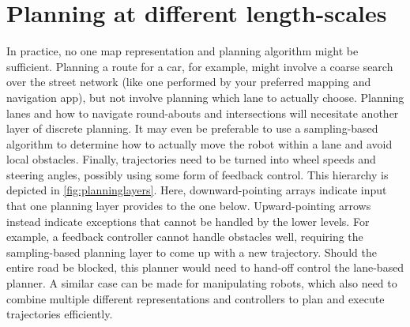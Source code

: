 \section{Planning at different length-scales}
In practice, no one map representation and planning algorithm might be sufficient. Planning a route for a car, for example, might involve a coarse search over the street network (like one performed by your preferred mapping and navigation app), but not involve planning which lane to actually choose. Planning lanes and how to navigate round-abouts and intersections will necesitate another layer of discrete planning. It may even be preferable to use a sampling-based algorithm to determine how to actually move the robot within a lane and avoid local obstacles. Finally, trajectories need to be turned into wheel speeds and steering angles, possibly using some form of feedback control. This hierarchy is depicted in \cref{fig:planninglayers}. Here, downward-pointing arrays indicate input that one planning layer provides to the one below. Upward-pointing arrows instead indicate exceptions that cannot be handled by the lower levels. For example, a feedback controller cannot handle obstacles well, requiring the sampling-based planning layer to come up with a new trajectory. Should the entire road be blocked, this planner would need to hand-off control the lane-based planner. A similar case can be made for manipulating robots, which also need to combine multiple different representations and controllers to plan and execute trajectories efficiently.

